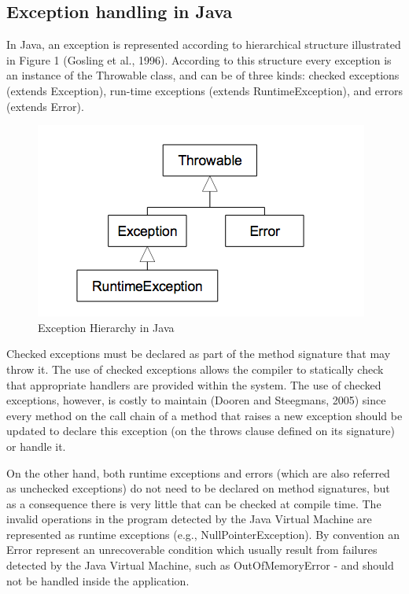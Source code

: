 \documentclass[conference]{IEEEtran}
\begin{document}
\subsection{Exception handling in Java}

In Java, an exception is represented according to hierarchical structure illustrated in Figure 1  (Gosling et al., 1996). According to this structure every exception is an instance of the Throwable class, and can be of three kinds: checked exceptions (extends Exception), run-time exceptions (extends RuntimeException), and errors (extends Error). 

\begin{figure}
\centering
\includegraphics[scale=0.5]{exception_hierarchy.png}
\caption{Exception Hierarchy in Java}
\label{fig:Exception Hierarchy in Java.}
\end{figure}

Checked exceptions must be declared as part of the method signature that may throw it. The use of checked exceptions allows the compiler to statically check that appropriate handlers are provided within the system. The use of checked exceptions, however, is costly to maintain (Dooren and Steegmans, 2005) since every method on the call chain of a method that raises a new exception should be updated to declare this exception (on the throws clause defined on its signature) or handle it. 

On the other hand, both runtime exceptions and errors (which are also referred as unchecked exceptions) do not need to be declared on method signatures, but as a consequence there is very little that can be checked at compile time. The invalid operations in the program detected by the Java Virtual Machine are represented as runtime exceptions (e.g., NullPointerException). By convention an Error represent an unrecoverable condition which usually result from failures detected by the Java Virtual Machine, such as OutOfMemoryError - and should not be handled inside the application. 
\end{document}
